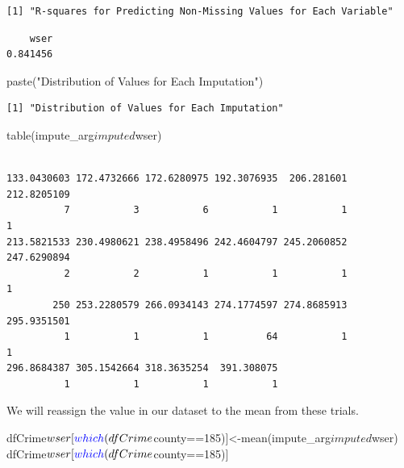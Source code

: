 \documentclass[]{article}
\newenvironment{Shaded}{}{}
\newcommand{\DecValTok}[1]{#1}
\newcommand{\KeywordTok}[1]{\textcolor[rgb]{0.00,0.00,1.00}{#1}}
\newcommand{\NormalTok}[1]{#1}
\newcommand{\OperatorTok}[1]{#1}
\newcommand{\StringTok}[1]{\textcolor[rgb]{0.00,0.50,0.50}{#1}}
\begin{document}
\begin{verbatim}
[1] "R-squares for Predicting Non-Missing Values for Each Variable"
\end{verbatim}

\begin{Shaded}
\end{Shaded}

\begin{verbatim}
    wser 
0.841456 
\end{verbatim}

\begin{Shaded}
\begin{Highlighting}[]
\KeywordTok{paste}\NormalTok{(}\StringTok{"Distribution of Values for Each Imputation"}\NormalTok{)}
\end{Highlighting}
\end{Shaded}

\begin{verbatim}
[1] "Distribution of Values for Each Imputation"
\end{verbatim}

\begin{Shaded}
\begin{Highlighting}[]
\KeywordTok{table}\NormalTok{(impute_arg}\OperatorTok{$}\NormalTok{imputed}\OperatorTok{$}\NormalTok{wser)}
\end{Highlighting}
\end{Shaded}

\begin{verbatim}

133.0430603 172.4732666 172.6280975 192.3076935  206.281601 212.8205109 
          7           3           6           1           1           1 
213.5821533 230.4980621 238.4958496 242.4604797 245.2060852 247.6290894 
          2           2           1           1           1           1 
        250 253.2280579 266.0934143 274.1774597 274.8685913 295.9351501 
          1           1           1          64           1           1 
296.8684387 305.1542664 318.3635254  391.308075 
          1           1           1           1 
\end{verbatim}

We will reassign the value in our dataset to the mean from these trials.

\begin{Shaded}
\begin{Highlighting}[]
\NormalTok{dfCrime}\OperatorTok{$}\NormalTok{wser[}\KeywordTok{which}\NormalTok{(dfCrime}\OperatorTok{$}\NormalTok{county}\OperatorTok{==}\DecValTok{185}\NormalTok{)]<-}\KeywordTok{mean}\NormalTok{(impute_arg}\OperatorTok{$}\NormalTok{imputed}\OperatorTok{$}\NormalTok{wser)}
\NormalTok{dfCrime}\OperatorTok{$}\NormalTok{wser[}\KeywordTok{which}\NormalTok{(dfCrime}\OperatorTok{$}\NormalTok{county}\OperatorTok{==}\DecValTok{185}\NormalTok{)]}
\end{Highlighting}
\end{Shaded}
\end{document}
